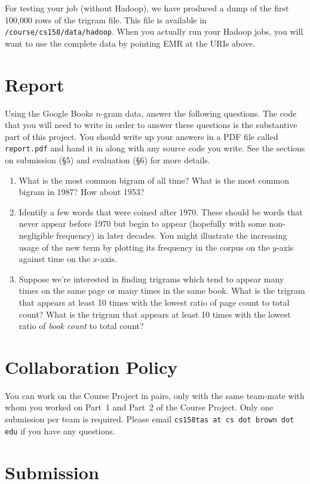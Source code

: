 \documentclass[10pt]{article}
\begin{document}
For testing your job (without Hadoop), we have produced a dump of the
first 100,000 rows of the trigram file. This file is available in
\texttt{/course/cs158/data/hadoop}. When you actually run your Hadoop
jobs, you will want to use the complete data by pointing EMR at the
URIs above.

\section{Report}
\label{spec}

Using the Google Books $n$-gram data, answer the following questions.
The code that you will need to write in order to answer these questions is
the substantive part of this project.
You should write up your answers in a PDF file called \texttt{report.pdf}
and hand it in along with any source code you write. See the sections on submission (\S 5)
and evaluation (\S 6) for more details.

\begin{enumerate}
\item What is the most common bigram of all time? What is the most common
bigram in 1987? How about 1953?
\item Identify a few words that were coined after 1970. These should
be words that never appear before 1970 but begin to appear (hopefully with
some non-negligible frequency) in later decades. You might illustrate the
increasing usage of the new term by plotting its frequency in the corpus
on the $y$-axis against time on the $x$-axis.
\item Suppose we're interested in finding trigrams which tend to appear
many times on the same page or many times in the same book. What is the trigram that
appears at least 10 times with the
lowest ratio of page count to total count? What is the trigram that appears at least
10 times with the lowest ratio of \textit{book count} to total count?  
\end{enumerate}


\section{Collaboration Policy}
\label{collab}
You can work on the Course Project in pairs,
only with the same team-mate with whom you worked on Part~1 and Part~2 of the Course Project.
Only one submission per team is required.
Please  email \texttt{cs158tas at cs dot brown dot edu} if you have any questions.


\section{Submission}
\end{document}
